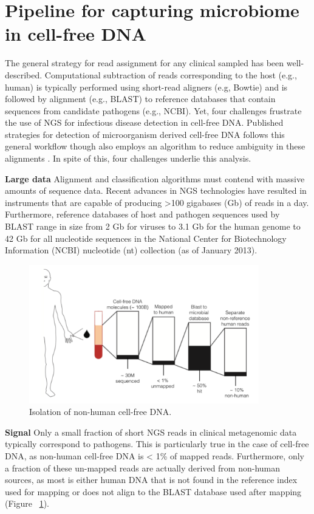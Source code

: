 \section{Pipeline for capturing microbiome in cell-free DNA}

The general strategy for read assignment for any clinical sampled has been well-described. Computational subtraction of reads corresponding to the host (e.g., human) is typically performed using short-read aligners (e.g, Bowtie) and is followed by alignment (e.g., BLAST) to reference databases that contain sequences from candidate pathogens (e.g., NCBI). Yet, four challenges frustrate the use of NGS for infectious disease detection in cell-free DNA. Published strategies for detection of microorganism derived cell-free DNA follows this general workflow \cite{DeVlaminck:2013hl} though also employs an algorithm to reduce ambiguity in these alignments \cite{Xia:2011it}. In spite of this, four challenges underlie this analysis.

\textbf{Large data} Alignment and classification algorithms must contend with massive amounts of sequence data. Recent advances in NGS technologies have resulted in instruments that are capable of producing >100 gigabases (Gb) of reads in a day. Furthermore, reference databases of host and pathogen sequences used by BLAST range in size from 2 Gb for viruses to 3.1 Gb for the human genome to 42 Gb for all nucleotide sequences in the National Center for Biotechnology Information (NCBI) nucleotide (nt) collection (as of January 2013). 

\begin{figure}
\center\includegraphics[width=100mm,scale=0.5]{Figures/Fig3}
\caption{Isolation of non-human cell-free DNA.}
\label{fig:Fig3}
\end{figure}

\textbf{Signal} Only a small fraction of short NGS reads in clinical metagenomic data typically correspond to pathogens. This is particularly true in the case of cell-free DNA, as non-human cell-free DNA is < 1\% of mapped reads. Furthermore, only a fraction of these un-mapped reads are actually derived from non-human sources, as most is either human DNA that is not found in the reference index used for mapping or does not align to the BLAST database used after mapping (Figure ~\ref{fig:Fig3}). 

